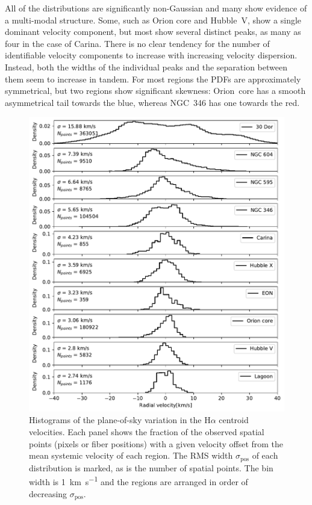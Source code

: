 \documentclass[fleqn,usenatbib, useAMS, a4paper]{mnras}
\newcommand\pos{\ensuremath{_{\mathrm{pos}}}}
\newcommand\ha{\ensuremath{\text{H}\alpha}}
\begin{document}
All of the distributions are significantly non-Gaussian
and many show evidence of a multi-modal structure.
Some, such as Orion core and Hubble~V, show a single dominant velocity component,
but most show several distinct peaks,
as many as four in the case of Carina.
There is no clear tendency for the number of identifiable velocity components
to increase with increasing velocity dispersion.
Instead, both the widths of the individual peaks and the separation between them
seem to increase in tandem.
For most regions the PDFs are approximately symmetrical,
but two regions show significant skewness:
Orion~core has a smooth asymmetrical tail towards the blue,
whereas NGC~346 has one towards the red.

\begin{figure}
 \centering
 \includegraphics[width=5in]{Figures/Hist}\par
 \caption{
   Histograms of the plane-of-sky variation in the \ha{} centroid velocities.
   Each panel shows the fraction of the observed spatial points
   (pixels or fiber positions)
   with a given velocity offset from the mean systemic velocity of each region.
   The RMS width \(\sigma\pos\) of each distribution is marked,
   as is the number of spatial points.
   The bin width is \SI{1}{km.s^{-1}} and the regions are arranged
   in order of decreasing \(\sigma\pos\).
 }
 \label{fig:hist}
\end{figure}
\end{document}
